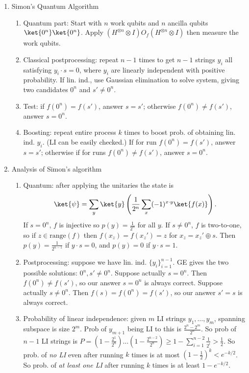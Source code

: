 \begin{enumerate}
    \item Simon's Quantum Algorithm
    \begin{enumerate}
        \item Quantum part: Start with $n$ work qubits and $n$ ancilla qubits $\ket{0^n}\ket{0^n}$. Apply $(H^{\otimes n}\otimes I)O_f(H^{\otimes n} \otimes I)$ then measure the work qubits.
        \item Classical postprocessing: repeat $n-1$ times to get $n-1$ strings $y_i$ all satisfying $y_i \cdot s =0$, where $y_i$ are linearly independent with positive probability. If lin. ind., use Gaussian elimination to solve system, giving two candidates $0^n$ and $s' \neq 0^n$. 
        \item Test: if $f(0^n)=f(s')$, answer $s=s'$; otherwise $f(0^n)\neq f(s')$, answer $s=0^n$.
        \item Boosting: repeat entire process $k$ times to boost prob. of obtaining lin. ind. $y_i$. (LI can be easily checked.) If for  run $f(0^n)=f(s')$, answer $s=s'$; otherwise if for  runs $f(0^n)\neq f(s')$, answer $s=0^n$.
    \end{enumerate}
    
    \item Analysis of Simon's algorithm
    \begin{enumerate}
        \item Quantum: after applying the unitaries the state is
        \begin{align*}
            \ket{\psi} = \sum_y \ket{y} \left( \frac{1}{2^n} \sum_x (-1)^{x \cdot y} \ket{f(x)} \right).
        \end{align*}
        If $s=0^n$, $f$ is injective so $p(y) = \frac{1}{2^n}$ for all $y$. If $s \neq 0^n$, $f$ is two-to-one, so if $z \in \text{range}(f)$ then $f(x_z) = f(x_z') = z$ for $x_z = x_z' \oplus s$. Then $p(y) = \frac{1}{2^{n-1}}$ if $y \cdot s = 0$, and $p(y) = 0$ if $y \cdot s = 1$.
        \item Postprocessing: suppose we have lin. ind. $\{y_i\}_{i=1}^{n-1}$. GE gives the two possible solutions: $0^n,s'\neq 0^n$. Suppose actually $s=0^n$. Then $f(0^n)\neq f(s')$, so our answer $s=0^n$ is always correct. Suppose actually $s \neq 0^n$. Then $f(s)=f(0^n)=f(s')$, so our answer $s'=s$ is always correct.
        \item Probability of linear independence: given $m$ LI strings $y_1,\dots,y_m$, spanning subspace is size $2^m$. Prob of $y_{m+1}$ being LI to this is $\frac{2^n-2^m}{2^n}$. So prob of $n-1$ LI strings is $P=(1-\frac{2^1}{2^n})\dots(1-\frac{2^{n-2}}{2^n}) \geq 1-\sum_{i=1}^{n-2} \frac{1}{2^i} > \frac{1}{2}$. So prob. of \textit{no LI} even after running $k$ times is at most $(1-\frac{1}{2})^k < e^{-k/2}$. So prob. of \textit{at least one LI} after running $k$ times is at least $1 - e^{-k/2}$.
    \end{enumerate}
\end{enumerate}



















% 
% 
% 

